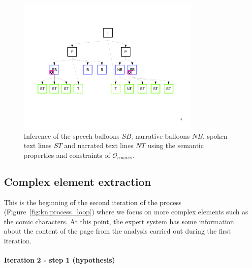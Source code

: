  \begin{figure}[!ht]  %
   \centering
  \includegraphics[trim= 30px 168px 20px 110px, clip, width=0.8\textwidth]{graph_infer_1.pdf}
  \caption[Inference of the speech balloons, narrative balloons, spoken text lines and narrated text lines using the semantic properties of the knowledge base]{Inference of the speech balloons $SB$, narrative balloons $NB$, spoken text lines $ST$ and narrated text lines $NT$ using the semantic properties and constraints of $\mathcal{O}_{comics}$.
  }
  \label{fig:kn:graph_specific_types}
 \end{figure}


\subsection{Complex element extraction} %
\label{sub:complex_element_extraction}

This is the beginning of the second iteration of the process (Figure~\ref{fig:kn:process_loop}) where we focus on more complex elements such as the comic characters.
At this point, the expert system has some information about the content of the page from the analysis carried out during the first iteration.

\paragraph{Iteration 2 - step 1 (hypothesis)} %
\label{par:step_4}

